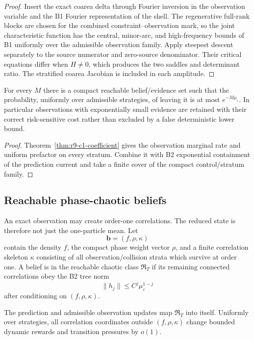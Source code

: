 \begin{proof}
Insert the exact coarea delta through Fourier inversion in the observation
variable and the B1 Fourier representation of the shell.  The regenerative
full-rank blocks are chosen for the combined constraint--observation mark, so
the joint characteristic function has the central, minor-arc, and
high-frequency bounds of B1 uniformly over the admissible observation family.
Apply steepest descent separately to the source numerator and zero-source
denominator.  Their critical equations differ when $H\ne0$, which produces
the two saddles and determinant ratio.  The stratified coarea Jacobian is
included in each amplitude.
\end{proof}

\begin{corollary}
\label{cor:r9-c1-evidence-tail}
For every $M$ there is a compact reachable belief/evidence set such that the
probability, uniformly over admissible strategies, of leaving it is at most
$e^{-M\mu_\varepsilon}$.  In particular observations with exponentially small
evidence are retained with their correct risk-sensitive cost rather than
excluded by a false deterministic lower bound.
\end{corollary}

\begin{proof}
Theorem~\ref{thm:r9-c1-coefficient} gives the observation marginal rate and
uniform prefactor on every stratum.  Combine it with B2 exponential
containment of the prediction current and take a finite cover of the compact
control/stratum family.
\end{proof}

\subsection{Reachable phase-chaotic beliefs}

An exact observation may create order-one correlations.  The reduced state is
therefore not just the one-particle mean.  Let
\[
 \mathbf b=(f,\rho,\kappa)
\]
contain the density $f$, the compact phase weight vector $\rho$, and a finite
correlation skeleton $\kappa$ consisting of all observation/collision strata
which survive at order one.  A belief is in the reachable chaotic class
$\mathfrak R_T$ if its remaining connected correlations obey the B2 tree norm
\[
 \|h_j\|\le C^j\mu_\varepsilon^{1-j}
\]
after conditioning on $(f,\rho,\kappa)$.

\begin{lemma}
\label{lem:r9-c1-chaos}
The prediction and admissible observation updates map
$\mathfrak R_T$ into itself.  Uniformly over strategies, all correlation
coordinates outside $(f,\rho,\kappa)$ change bounded dynamic rewards and
transition pressures by $o(1)$.
\end{lemma}

